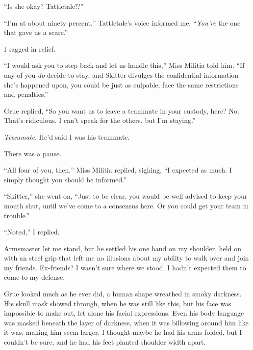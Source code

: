 ``Is she okay?  Tattletale!?''



``I'm at about ninety percent,'' Tattletale's voice informed me.  ``\emph{You're} the one that gave us a scare.''



I sagged in relief.



``I would ask you to step back and let us handle this,'' Miss Militia told him.  ``If any of you \emph{do} decide to stay, and Skitter divulges the confidential information she's happened upon, you could be just as culpable, face the same restrictions and penalties.''



Grue replied, ``So you want us to leave a teammate in your custody, here?  No.  That's ridiculous.  I can't speak for the others, but I'm staying.''



\emph{Teammate}.  He'd said I was his teammate.



There was a pause.



``All four of you, then,'' Miss Militia replied, sighing, ``I expected as much.  I simply thought you should be informed.''



``Skitter,'' she went on, ``Just to be clear, you would be well advised to keep your mouth shut, until we've come to a consensus here.  Or you could get your team in trouble.''



``Noted,'' I replied.



Armsmaster let me stand, but he settled his one hand on my shoulder, held on with an steel grip that left me no illusions about my ability to walk over and join my friends.  Ex-friends?  I wasn't sure where we stood.  I hadn't expected them to come to my defense.



Grue looked much as he ever did, a human shape wreathed in smoky darkness.  His skull mask showed through, when he was still like this, but his face was impossible to make out, let alone his facial expressions.  Even his body language was masked beneath the layer of darkness, when it was billowing around him like it was, making him seem larger.  I thought maybe he had his arms folded, but I couldn't be sure, and he had his feet planted shoulder width apart.



